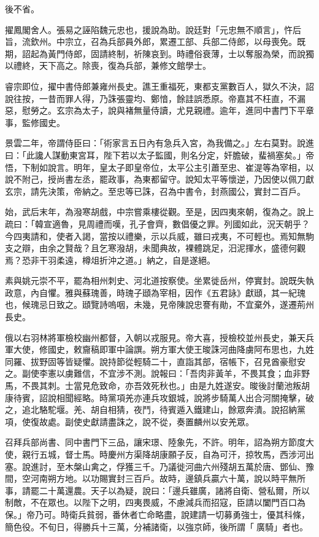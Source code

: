 \begin{pinyinscope}
 後不省。



 擢鳳閣舍人。張易之誣陷魏元忠也，援說為助。說廷對「元忠無不順言」，忤后旨，流欽州。中宗立，召為兵部員外郎，累遷工部、兵部二侍郎，以母喪免。既期，詔起為黃門侍郎，固請終制，祈陳哀到。時禮俗衰薄，士以奪服為榮，而說獨以禮終，天下高之。除喪，復為兵部，兼修文館學士。



 睿宗即位，擢中書侍郎兼雍州長史。譙王重福死，東都支黨數百人，獄久不決，詔說往按，一昔而罪人得，乃誅張靈均、鄭愔，餘詿誤悉原。帝嘉其不枉直，不漏惡，慰勞之。玄宗為太子，說與褚無量侍讀，尤見親禮。逾年，進同中書門下平章事，監修國史。



 景雲二年，帝謂侍臣曰：「術家言五日內有急兵入宮，為我備之。」左右莫對。說進曰：「此讒人謀動東宮耳，陛下若以太子監國，則名分定，奸膽破，蜚禍塞矣。」帝悟，下制如說言。明年，皇太子即皇帝位，太平公主引蕭至忠、崔湜等為宰相，以說不附己，授尚書左丞，罷政事，為東都留守。說知太平等懷逆，乃因使以佩刀獻玄宗，請先決策，帝納之。至忠等已誅，召為中書令，封燕國公，實封二百戶。



 始，武后末年，為潑寒胡戲，中宗嘗乘樓從觀。至是，因四夷來朝，復為之。說上疏曰：「韓宣適魯，見周禮而嘆，孔子會齊，數倡優之罪。列國如此，況天朝乎？今四夷請和，使者入謁，當按以禮樂，示以兵威，雖曰戎夷，不可輕也。焉知無駒支之辯，由余之賢哉？且乞寒潑胡，未聞典故，裸體跳足，汨泥揮水，盛德何觀焉？恐非干羽柔遠，樽俎折沖之道。」納之，自是遂絕。



 素與姚元崇不平，罷為相州刺史、河北道按察使。坐累徙岳州，停實封。說既失執政意，內自懼。雅與蘇瑰善，時瑰子頲為宰相，因作《五君詠》獻頲，其一紀瑰也，候瑰忌日致之。頲覽詩嗚咽，未幾，見帝陳說忠謇有勛，不宜棄外，遂遷荊州長史。



 俄以右羽林將軍檢校幽州都督，入朝以戎服見。帝大喜，授檢校並州長史，兼天兵軍大使，修國史，敕齎稿即軍中論譔。朔方軍大使王晙誅河曲降虜阿布思也，九姓同羅、拔野固等皆疑懼。說持節從輕騎二十，直詣其部，宿帳下，召見酋豪慰安之。副使李憲以虜難信，不宜涉不測。說報曰：「吾肉非黃羊，不畏其食；血非野馬，不畏其刺。士當見危致命，亦吾效死秋也。」由是九姓遂安。晙後討蘭池叛胡康待賓，詔說相聞經略。時黨項羌亦連兵攻銀城，說將步騎萬人出合河關掩擊，破之，追北駱駝堰。羌、胡自相猜，夜鬥，待賓遁入鐵建山，餘眾奔潰。說招納黨項，使復故處。副使史獻請盡誅之，說不從，奏置麟州以安羌眾。



 召拜兵部尚書、同中書門下三品，讓宋璟、陸象先，不許。明年，詔為朔方節度大使，親行五城，督士馬。時慶州方渠降胡康願子反，自為可汗，掠牧馬，西涉河出塞。說進討，至木槃山禽之，俘獲三千。乃議徙河曲六州殘胡五萬於唐、鄧仙、豫間，空河南朔方地。以功賜實封三百戶。故時，邊鎮兵贏六十萬，說以時平無所事，請罷二十萬還農。天子以為疑，說曰：「邊兵雖廣，諸將自衛、營私爾，所以制敵，不在眾也。以陛下之明，四夷畏威，不慮減兵而招寇，臣請以闔門百口為保。」帝乃可。時衛兵貧弱，番休者亡命略盡，說建請一切募勇強士，優其科條，簡色役。不旬日，得勝兵十三萬，分補諸衛，以強京師，後所謂「廣騎」者也。




\end{pinyinscope}
